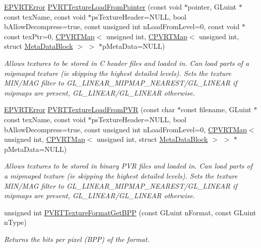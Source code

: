 \begin{DoxyCompactItemize}
\item 
\hyperlink{_p_v_r_t_error_8h_a9e837ff1a83f3a5f332bc4cc78454608}{E\+P\+V\+R\+T\+Error} \hyperlink{group___a_p_i___o_g_l_e_s_ga49dc74480ad4ec5a2f393f641117d54f}{P\+V\+R\+T\+Texture\+Load\+From\+Pointer} (const void $\ast$pointer, G\+Luint $\ast$const tex\+Name, const void $\ast$ps\+Texture\+Header=N\+U\+L\+L, bool b\+Allow\+Decompress=true, const unsigned int n\+Load\+From\+Level=0, const void $\ast$const tex\+Ptr=0, \hyperlink{singleton_c_p_v_r_t_map}{C\+P\+V\+R\+T\+Map}$<$ unsigned int, \hyperlink{singleton_c_p_v_r_t_map}{C\+P\+V\+R\+T\+Map}$<$ unsigned int, struct \hyperlink{struct_meta_data_block}{Meta\+Data\+Block} $>$ $>$ $\ast$p\+Meta\+Data=N\+U\+L\+L)
\begin{DoxyCompactList}\small\item\em Allows textures to be stored in C header files and loaded in. Can load parts of a mipmaped texture (ie skipping the highest detailed levels). Sets the texture M\+I\+N/\+M\+A\+G filter to G\+L\+\_\+\+L\+I\+N\+E\+A\+R\+\_\+\+M\+I\+P\+M\+A\+P\+\_\+\+N\+E\+A\+R\+E\+S\+T/\+G\+L\+\_\+\+L\+I\+N\+E\+A\+R if mipmaps are present, G\+L\+\_\+\+L\+I\+N\+E\+A\+R/\+G\+L\+\_\+\+L\+I\+N\+E\+A\+R otherwise. \end{DoxyCompactList}\item 
\hyperlink{_p_v_r_t_error_8h_a9e837ff1a83f3a5f332bc4cc78454608}{E\+P\+V\+R\+T\+Error} \hyperlink{group___a_p_i___o_g_l_e_s_ga6eecac4c871ba7ccdd0ef4b057a7d596}{P\+V\+R\+T\+Texture\+Load\+From\+P\+V\+R} (const char $\ast$const filename, G\+Luint $\ast$const tex\+Name, const void $\ast$ps\+Texture\+Header=N\+U\+L\+L, bool b\+Allow\+Decompress=true, const unsigned int n\+Load\+From\+Level=0, \hyperlink{singleton_c_p_v_r_t_map}{C\+P\+V\+R\+T\+Map}$<$ unsigned int, \hyperlink{singleton_c_p_v_r_t_map}{C\+P\+V\+R\+T\+Map}$<$ unsigned int, struct \hyperlink{struct_meta_data_block}{Meta\+Data\+Block} $>$ $>$ $\ast$p\+Meta\+Data=N\+U\+L\+L)
\begin{DoxyCompactList}\small\item\em Allows textures to be stored in binary P\+V\+R files and loaded in. Can load parts of a mipmaped texture (ie skipping the highest detailed levels). Sets the texture M\+I\+N/\+M\+A\+G filter to G\+L\+\_\+\+L\+I\+N\+E\+A\+R\+\_\+\+M\+I\+P\+M\+A\+P\+\_\+\+N\+E\+A\+R\+E\+S\+T/\+G\+L\+\_\+\+L\+I\+N\+E\+A\+R if mipmaps are present, G\+L\+\_\+\+L\+I\+N\+E\+A\+R/\+G\+L\+\_\+\+L\+I\+N\+E\+A\+R otherwise. \end{DoxyCompactList}\item 
unsigned int \hyperlink{group___a_p_i___o_g_l_e_s_gac4a10faa0f44d4808ae619086f605113}{P\+V\+R\+T\+Texture\+Format\+Get\+B\+P\+P} (const G\+Luint n\+Format, const G\+Luint n\+Type)
\begin{DoxyCompactList}\small\item\em Returns the bits per pixel (B\+P\+P) of the format. \end{DoxyCompactList}\end{DoxyCompactItemize}


